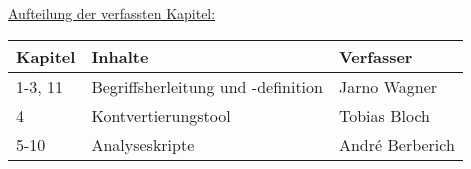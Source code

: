 \begin{center}
{\huge \underline{Aufteilung der verfassten Kapitel:}}\\
\end{center}

\begin{table}[H]
	\begin{center}
		\begin{tabular}{| m{3cm} | m{4cm} | m{4cm} |} 
			\hline
			\textbf{Kapitel} & \textbf{Inhalte} & \textbf{Verfasser} \\ 
			\hline\hline
			1-3, 11 & Begriffsherleitung und -definition & Jarno Wagner \\ 
			\hline 
			4 & Kontvertierungstool & Tobias Bloch \\ 
			\hline 
			5-10 & Analyseskripte  & André Berberich \\ 
			\hline 
			\end{tabular}
	\end{center}
\end{table}

\newpage